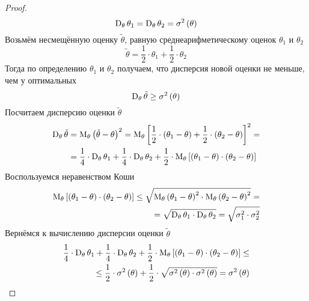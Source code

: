 \begin{proof}
  $$\operatorname{D}_{\theta} \theta_1
    = \operatorname{D}_{\theta} \theta_2
    = \sigma^2\left(\theta\right)$$
  Возьмём несмещённую оценку $\tilde{\theta}$,
  равную среднеарифметическому оценок $\theta_1$ и $\theta_2$
  $$\tilde{\theta} = \frac{1}{2}\cdot \theta_1 + \frac{1}{2} \cdot \theta_2$$
  Тогда по определению $\theta_1$ и $\theta_2$ получаем,
  что дисперсия новой оценки не меньше, чем у оптимальных
  \begin{equation}\label{eq:estimator_ge}
    \operatorname{D}_{\theta} \tilde{\theta}\ge\sigma^2\left(\theta\right)
  \end{equation}
  Посчитаем дисперсию оценки $\tilde{\theta}$
  \begin{align*}
  \operatorname{D}_{\theta} \tilde{\theta}
    &= \operatorname{M}_{\theta} \left( \tilde{\theta}-\theta \right)^2
    = \operatorname{M}_{\theta} \left[ \frac{1}{2}\cdot \left( \theta_1-\theta \right)
      + \frac{1}{2}\cdot \left( \theta_2-\theta \right) \right]^2= \\
    &= \frac{1}{4}\cdot \operatorname{D}_{\theta} \theta_1
      + \frac{1}{4}\cdot \operatorname{D}_{\theta} \theta_2
      + \frac{1}{2}\cdot \operatorname{M}_{\theta} \left[ \left( \theta_1-\theta \right)
          \cdot \left( \theta_2-\theta \right) \right]
  \end{align*}
  Воспользуемся неравенством Коши%
  \begin{eqnarray}\label{eq:koshi_eq}
    \operatorname{M}_{\theta} \left[ \left( \theta_1-\theta \right)
      \cdot \left( \theta_2-\theta \right) \right]
    \le\sqrt{\operatorname{M}_{\theta} \left( \theta_1-\theta \right)^2
      \cdot \operatorname{M}_{\theta} \left( \theta_2-\theta \right)^2}= \\
    = \sqrt{\operatorname{D}_{\theta} \theta_1
      \cdot \operatorname{D}_{\theta} \theta_2}
    = \sqrt{\sigma_1^2 \cdot \sigma_2^2}\nonumber
  \end{eqnarray}
  Вернёмся к вычислению дисперсии оценки $\tilde{\theta}$
  \begin{align*}
    \frac{1}{4}\cdot \operatorname{D}_{\theta} \theta_1
      + \frac{1}{4}\cdot \operatorname{D}_{\theta} \theta_2
      + \frac{1}{2}\cdot \operatorname{M}_{\theta} \left[ \left( \theta_1-\theta \right)
          \cdot \left( \theta_2-\theta \right) \right]\le\\
    \le\frac{1}{2}\cdot \sigma^2\left( \theta \right)
      + \frac{1}{2}\cdot \sqrt{\sigma^2\left( \theta \right)
        \cdot \sigma^2\left( \theta \right)}
    = \sigma^2\left( \theta \right)
  \end{align*}

\end{proof}
